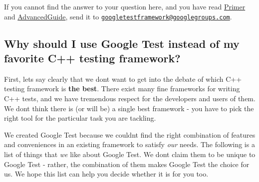 If you cannot find the answer to your question here, and you have read \hyperlink{V1__5__Primer_8md}{Primer} and \hyperlink{V1__5__AdvancedGuide_8md}{Advanced\+Guide}, send it to \href{mailto:googletestframework@googlegroups.com}{\tt googletestframework@googlegroups.\+com}.

\subsection*{Why should I use Google Test instead of my favorite C++ testing framework?}

First, let\textquotesingle{}s say clearly that we don\textquotesingle{}t want to get into the debate of which C++ testing framework is {\bfseries the best}. There exist many fine frameworks for writing C++ tests, and we have tremendous respect for the developers and users of them. We don\textquotesingle{}t think there is (or will be) a single best framework -\/ you have to pick the right tool for the particular task you are tackling.

We created Google Test because we couldn\textquotesingle{}t find the right combination of features and conveniences in an existing framework to satisfy {\itshape our} needs. The following is a list of things that {\itshape we} like about Google Test. We don\textquotesingle{}t claim them to be unique to Google Test -\/ rather, the combination of them makes Google Test the choice for us. We hope this list can help you decide whether it is for you too.



